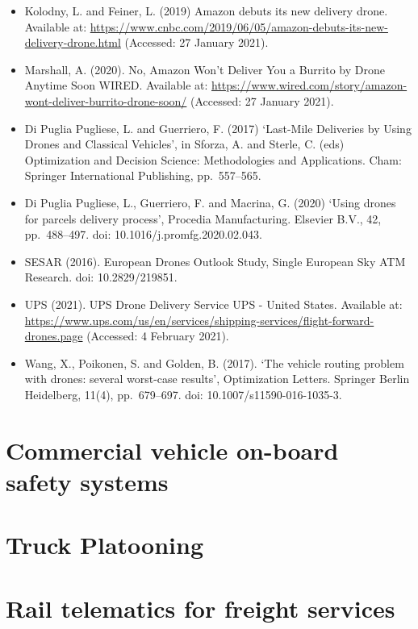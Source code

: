 \documentclass[
]{book}
\begin{document}
\begin{itemize}
\item
  Kolodny, L. and Feiner, L. (2019) Amazon debuts its new delivery drone. Available at: \url{https://www.cnbc.com/2019/06/05/amazon-debuts-its-new-delivery-drone.html} (Accessed: 27 January 2021).
\item
  Marshall, A. (2020). No, Amazon Won't Deliver You a Burrito by Drone Anytime Soon \textbar{} WIRED. Available at: \url{https://www.wired.com/story/amazon-wont-deliver-burrito-drone-soon/} (Accessed: 27 January 2021).
\item
  Di Puglia Pugliese, L. and Guerriero, F. (2017) `Last-Mile Deliveries by Using Drones and Classical Vehicles', in Sforza, A. and Sterle, C. (eds) Optimization and Decision Science: Methodologies and Applications. Cham: Springer International Publishing, pp.~557--565.
\item
  Di Puglia Pugliese, L., Guerriero, F. and Macrina, G. (2020) `Using drones for parcels delivery process', Procedia Manufacturing. Elsevier B.V., 42, pp.~488--497. doi: 10.1016/j.promfg.2020.02.043.
\item
  SESAR (2016). European Drones Outlook Study, Single European Sky ATM Research. doi: 10.2829/219851.
\item
  UPS (2021). UPS Drone Delivery Service \textbar{} UPS - United States. Available at: \url{https://www.ups.com/us/en/services/shipping-services/flight-forward-drones.page} (Accessed: 4 February 2021).
\item
  Wang, X., Poikonen, S. and Golden, B. (2017). `The vehicle routing problem with drones: several worst-case results', Optimization Letters. Springer Berlin Heidelberg, 11(4), pp.~679--697. doi: 10.1007/s11590-016-1035-3.
\end{itemize}

\hypertarget{commercial-vehicle-on-board-safety-systems}{%
\section{Commercial vehicle on-board safety systems}\label{commercial-vehicle-on-board-safety-systems}}

\hypertarget{truck-platooning}{%
\section{Truck Platooning}\label{truck-platooning}}

\hypertarget{rail-telematics-for-freight-services}{%
\section{Rail telematics for freight services}\label{rail-telematics-for-freight-services}}
\end{document}
